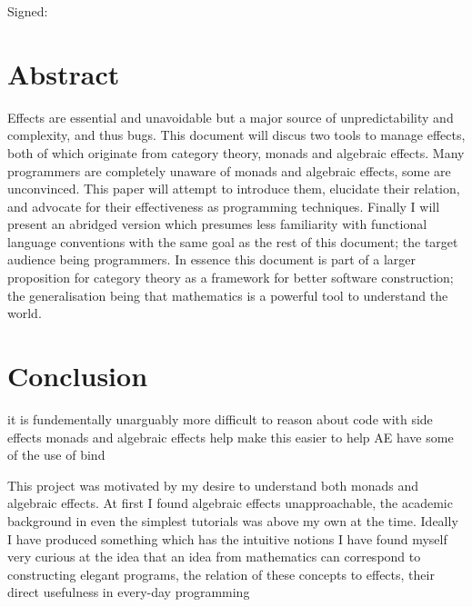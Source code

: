 \documentclass[a4paper,10pt]{article}
\newenvironment{spaced}[1]
  {\begin{minipage}[c]{\textwidth}\vspace{#1}}
  {\end{minipage}}
\theoremstyle{definition}
\begin{document}
  \begin{spaced}{5em}
    Signed:
  \end{spaced}
\pagebreak

\section{Abstract}

Effects are essential and unavoidable
but a major source of unpredictability
and complexity, and thus bugs.
This document will discus two tools to manage effects,
both of which originate from category theory,
monads and algebraic effects.
Many programmers are completely unaware of monads and algebraic effects,
some are unconvinced.
This paper will attempt to introduce them,
elucidate their relation,
and advocate for their effectiveness as programming techniques.
Finally I will present an abridged version
which presumes less familiarity with functional language conventions
with the same goal as the rest of this document;
the target audience being programmers.
In essence this document is part of a larger
proposition for category theory as a framework for better software construction;
the generalisation being that mathematics is a powerful tool to understand the world.

\pagebreak
\tableofcontents

\pagebreak


\pagebreak


\pagebreak


\pagebreak


\pagebreak


\pagebreak
\section{Conclusion}
it is fundementally unarguably more difficult to reason about code with side effects
monads and algebraic effects help make this easier
to help AE have some of the use of bind

This project was motivated by my desire to understand both monads and algebraic effects.
At first I found algebraic effects
unapproachable,
the academic background
in even the simplest tutorials
was above my own at the time.
Ideally I have produced
something which has the intuitive notions
I have found myself very curious at the idea that an idea from
mathematics can correspond to constructing elegant programs,
the relation of these concepts
to effects,
their direct usefulness in
every-day programming
\end{document}

